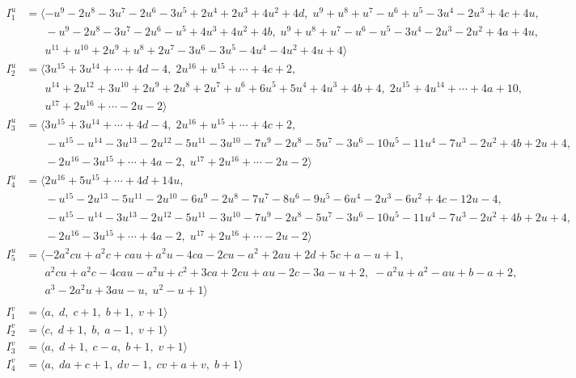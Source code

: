 \documentclass[1p]{elsarticle_modified}
\theoremstyle{definition}
\begin{document}
\begin{align*}
I^u_{1}&=\langle 
- u^9-2 u^8-3 u^7-2 u^6-3 u^5+2 u^4+2 u^3+4 u^2+4 d,\;u^9+u^8+u^7- u^6+u^5-3 u^4-2 u^3+4 c+4 u,\\
\phantom{I^u_{1}}&\phantom{= \langle  }- u^9-2 u^8-3 u^7-2 u^6- u^5+4 u^3+4 u^2+4 b,\;u^9+u^8+u^7- u^6- u^5-3 u^4-2 u^3-2 u^2+4 a+4 u,\\
\phantom{I^u_{1}}&\phantom{= \langle  }u^{11}+u^{10}+2 u^9+u^8+2 u^7-3 u^6-3 u^5-4 u^4-4 u^2+4 u+4\rangle \\
I^u_{2}&=\langle 
3 u^{15}+3 u^{14}+\cdots+4 d-4,\;2 u^{16}+u^{15}+\cdots+4 c+2,\\
\phantom{I^u_{2}}&\phantom{= \langle  }u^{14}+2 u^{12}+3 u^{10}+2 u^9+2 u^8+2 u^7+u^6+6 u^5+5 u^4+4 u^3+4 b+4,\;2 u^{15}+4 u^{14}+\cdots+4 a+10,\\
\phantom{I^u_{2}}&\phantom{= \langle  }u^{17}+2 u^{16}+\cdots-2 u-2\rangle \\
I^u_{3}&=\langle 
3 u^{15}+3 u^{14}+\cdots+4 d-4,\;2 u^{16}+u^{15}+\cdots+4 c+2,\\
\phantom{I^u_{3}}&\phantom{= \langle  }- u^{15}- u^{14}-3 u^{13}-2 u^{12}-5 u^{11}-3 u^{10}-7 u^9-2 u^8-5 u^7-3 u^6-10 u^5-11 u^4-7 u^3-2 u^2+4 b+2 u+4,\\
\phantom{I^u_{3}}&\phantom{= \langle  }-2 u^{16}-3 u^{15}+\cdots+4 a-2,\;u^{17}+2 u^{16}+\cdots-2 u-2\rangle \\
I^u_{4}&=\langle 
2 u^{16}+5 u^{15}+\cdots+4 d+14 u,\\
\phantom{I^u_{4}}&\phantom{= \langle  }- u^{15}-2 u^{13}-5 u^{11}-2 u^{10}-6 u^9-2 u^8-7 u^7-8 u^6-9 u^5-6 u^4-2 u^3-6 u^2+4 c-12 u-4,\\
\phantom{I^u_{4}}&\phantom{= \langle  }- u^{15}- u^{14}-3 u^{13}-2 u^{12}-5 u^{11}-3 u^{10}-7 u^9-2 u^8-5 u^7-3 u^6-10 u^5-11 u^4-7 u^3-2 u^2+4 b+2 u+4,\\
\phantom{I^u_{4}}&\phantom{= \langle  }-2 u^{16}-3 u^{15}+\cdots+4 a-2,\;u^{17}+2 u^{16}+\cdots-2 u-2\rangle \\
I^u_{5}&=\langle 
-2 a^2 c u+a^2 c+c a u+a^2 u-4 c a-2 c u- a^2+2 a u+2 d+5 c+a- u+1,\\
\phantom{I^u_{5}}&\phantom{= \langle  }a^2 c u+a^2 c-4 c a u- a^2 u+c^2+3 c a+2 c u+a u-2 c-3 a- u+2,\;- a^2 u+a^2- a u+b- a+2,\\
\phantom{I^u_{5}}&\phantom{= \langle  }a^3-2 a^2 u+3 a u- u,\;u^2- u+1\rangle \\
\\
I^v_{1}&=\langle 
a,\;d,\;c+1,\;b+1,\;v+1\rangle \\
I^v_{2}&=\langle 
c,\;d+1,\;b,\;a-1,\;v+1\rangle \\
I^v_{3}&=\langle 
a,\;d+1,\;c- a,\;b+1,\;v+1\rangle \\
I^v_{4}&=\langle 
a,\;d a+c+1,\;d v-1,\;c v+a+v,\;b+1\rangle \\
\end{align*}
\end{document}
